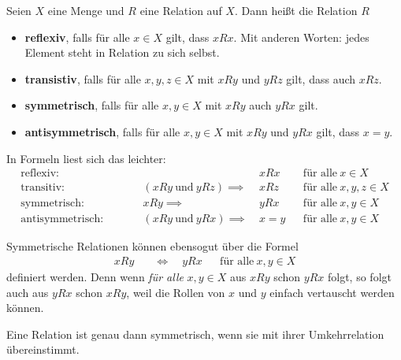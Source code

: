 \begin{defin}    
    Seien $X$ eine Menge und $R$ eine Relation auf $X$. Dann heißt die Relation $R$
    \begin{itemize}
        \item \textbf{reflexiv}, falls für alle $x\in X$ gilt, dass $xRx$. Mit anderen Worten: jedes Element steht in Relation zu sich selbst.
        \item \textbf{transistiv}, falls für alle $x,y,z\in X$ mit $xRy$ und $yRz$ gilt, dass auch $xRz$.
        \item \textbf{symmetrisch}, falls für alle $x,y\in X$ mit $xRy$ auch $yRx$ gilt.
        \item \textbf{antisymmetrisch}, falls für alle $x,y\in X$ mit $xRy$ und $yRx$ gilt, dass $x=y$.
    \end{itemize}
    In Formeln liest sich das leichter:
    \begin{align*}
        \text{reflexiv:} \qquad &&& xRx && \text{für alle}\ x\in X \\
        \text{transitiv:} \qquad && (xRy\ \text{und}\ yRz) \implies\ & xRz && \text{für alle}\ x,y,z\in X\\
        \text{symmetrisch:} \qquad && xRy \implies\ & yRx && \text{für alle}\ x,y\in X \\
        \text{antisymmetrisch:} \qquad && (xRy\ \text{und}\ yRx) \implies\ & x=y && \text{für alle}\ x,y\in X
    \end{align*}
\end{defin}


\begin{bem}
    Symmetrische Relationen können ebensogut über die Formel
    \begin{align*}
        xRy\quad & \iff \quad yRx && \text{für alle}\ x,y\in X
    \end{align*}
    definiert werden. Denn wenn \emph{für alle} $x,y\in X$ aus $xRy$ schon $yRx$ folgt, so folgt auch aus $yRx$ schon $xRy$, weil die Rollen von $x$ und $y$ einfach vertauscht werden können.

    Eine Relation ist genau dann symmetrisch, wenn sie mit ihrer Umkehrrelation übereinstimmt.
\end{bem}



